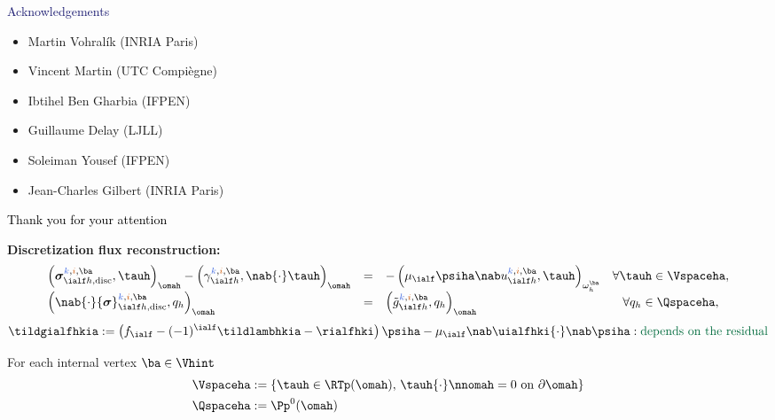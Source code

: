 \begin{frame}
\begin{overprint}

\vspace{0.3 cm}
\begin{center}
\LARGE{\textcolor{midnightblue}{Acknowledgements}}
\end{center}
\begin{itemize}
\item 
Martin Vohral\'{i}k (INRIA Paris)
\item
Vincent Martin (UTC Compiègne)
\item 
 Ibtihel Ben Gharbia (IFPEN)
 \item 
 Guillaume Delay (LJLL)
 \item 
 Soleiman Yousef (IFPEN)
 \item 
 Jean-Charles Gilbert (INRIA Paris)
\end{itemize}
\vspace*{0.2 cm}
\begin{center}
\Huge{\textcolor{black}{Thank you for your attention}}
\end{center}


\textcolor{cadmiumgreen}{\textbf{Discretization flux reconstruction:}}
\begin{equation*}
\begin{array}{lclcc}
\left({\bm \sigma}_{\ialf h, \mathrm{disc}}^{\kk,\ii,\ba}, \tauh\right)_{\omah}- \left(\gamma_{\ialf h}^{\kk,\ii,\ba},\nab {\cdot} \tauh\right)_{\omah}
&=& -\left(\mu_\ialf \psiha \nab u_{\ialf h}^{\kk,\ii,\ba}, \tauh \right)_{\omega_h^{\ba}}
&  \forall \tauh\in \Vspaceha, \\
\left(\nab {\cdot} {\bm \sigma}_{\ialf h, \mathrm{disc}}^{\kk,\ii, \ba}, q_{h}\right)_{\omah}
&=&\left(\tilde{g}_{\ialf h}^{\kk,\ii,\ba}, q_{h}\right)_{\omah}
&  \forall q_{h}\in \Qspaceha,
\end{array}
\end{equation*}
\begin{equation*}
\tildgialfhkia \egaldef \left(f_\ialf -(-1)^{\ialf} \tildlambhkia -\rialfhki \right) \psiha- \mu_\ialf \nab \uialfhki {\cdot} \nab \psiha : \mbox{\textcolor{cadmiumgreen}{depends on the residual}} 
\end{equation*}
\begin{minipage}[c]{0.4 \linewidth}
For each internal vertex $ \ba \in \Vhint$
\vspace{-0.2 cm}
\begin{equation*}
\begin{split}
\Vspaceha & \egaldef
 \left\{\tauh  \in \RTp(\omah), \, \tauh {\cdot} \nnomah=0  \mbox{ on } \partial \omah \right\}\\
\Qspaceha &  \egaldef \Pp^{0}(\omah)
\end{split}
\vspace{-0.2 cm}
\end{equation*}


\end{minipage}
\end{overprint}
\end{frame}
